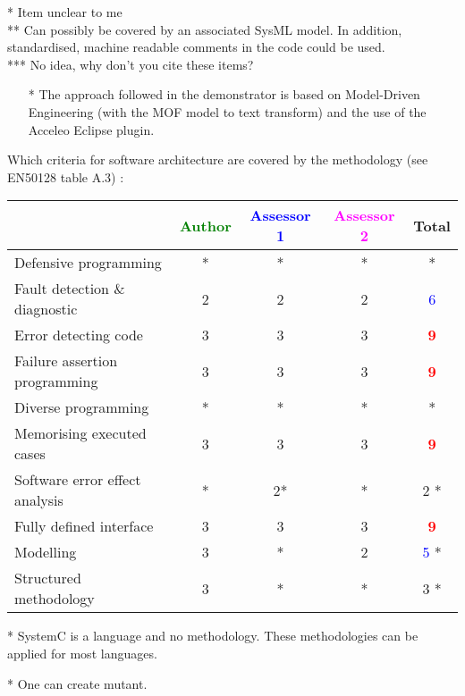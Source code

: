 \begin{author_comment}
* Item unclear to me\\
** Can possibly be covered by an associated SysML model. In addition, standardised, machine readable comments in the code could be used.\\
*** No idea, why don't you cite these items?
\end{author_comment}

\begin{assessor2}
  \begin{itemize}
  \item[*] The approach followed in the demonstrator is based on
    Model-Driven Engineering (with the MOF model to text transform)
    and the use of the Acceleo Eclipse plugin.
  \end{itemize}  
\end{assessor2}



Which criteria for software architecture are covered by the methodology
(see EN50128 table A.3) :

\begin{tabular}{|l | c | c | c | c|}
\hline
& \textcolor{green}{Author} & \textcolor{blue}{Assessor 1} & \textcolor{magenta}{Assessor 2} & Total \\
\hline
Defensive programming &* &* & * & * \\
\hline
Fault detection \& diagnostic &2 &2 &2 & \textcolor{blue}{6} \\
\hline
Error detecting code &3 &3 &3 & \textcolor{red}{\textbf{9}} \\
\hline
Failure assertion programming &3 &3 &3 & \textcolor{red}{\textbf{9}} \\
\hline
Diverse programming &* &* & * & * \\
\hline
Memorising executed cases &3 &3 &3 & \textcolor{red}{\textbf{9}} \\
\hline
Software error effect analysis &* &2* & * & 2    * \\
\hline
Fully defined interface &3 &3 &3 & \textcolor{red}{\textbf{9}} \\
\hline
Modelling &3 & * &2 & \textcolor{blue}{5} * \\
\hline
Structured methodology &3 & * & * & 3    * \\
\hline
\end{tabular}

\begin{author_comment}
 * SystemC is a language and no methodology. These methodologies can be applied for most languages.
\end{author_comment}
\begin{assessor1}
* One can create mutant.
\end{assessor1}

